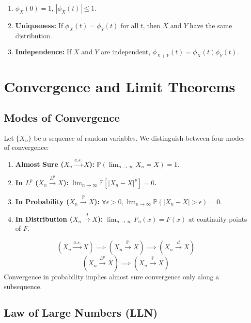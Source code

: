 \documentclass[oneside]{book}
\begin{document}
\begin{theorem}[Properties]
\begin{enumerate}
    \item $\phi_X(0) = 1$, $|\phi_X(t)| \le 1$.
    \item \textbf{Uniqueness:} If $\phi_X(t) = \phi_Y(t)$ for all $t$, then $X$ and $Y$ have the same distribution.
    \item \textbf{Independence:} If $X$ and $Y$ are independent, $\phi_{X+Y}(t) = \phi_X(t)\phi_Y(t)$.
\end{enumerate}
\end{theorem}

\section{Convergence and Limit Theorems}

\subsection{Modes of Convergence}

Let $\{X_n\}$ be a sequence of random variables. We distinguish between four modes of convergence:

\begin{enumerate}
    \item \textbf{Almost Sure ($X_n \xrightarrow{a.s.} X$):} $\mathbb{P}(\lim_{n \to \infty} X_n = X) = 1$.
    \item \textbf{In $L^p$ ($X_n \xrightarrow{L^p} X$):} $\lim_{n \to \infty} \mathbb{E}[|X_n - X|^p] = 0$.
    \item \textbf{In Probability ($X_n \xrightarrow{\mathbb{P}} X$):} $\forall \epsilon > 0, \lim_{n \to \infty} \mathbb{P}(|X_n - X| > \epsilon) = 0$.
    \item \textbf{In Distribution ($X_n \xrightarrow{d} X$):} $\lim_{n \to \infty} F_n(x) = F(x)$ at continuity points of $F$.
\end{enumerate}

\begin{remark}[Relationships]
\[ (X_n \xrightarrow{a.s.} X) \implies (X_n \xrightarrow{\mathbb{P}} X) \implies (X_n \xrightarrow{d} X) \]
\[ (X_n \xrightarrow{L^p} X) \implies (X_n \xrightarrow{\mathbb{P}} X) \]
Convergence in probability implies almost sure convergence only along a subsequence.
\end{remark}

\subsection{Law of Large Numbers (LLN)}
\end{document}
